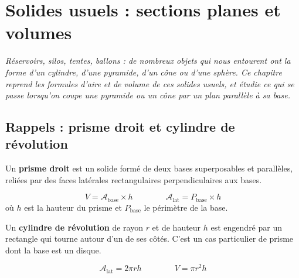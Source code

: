 \chapter{Solides usuels : sections planes et volumes}

\noindent\textit{Réservoirs, silos, tentes, ballons : de nombreux objets qui nous entourent
ont la forme d'un cylindre, d'une pyramide, d'un cône ou d'une sphère. Ce chapitre reprend
les formules d'aire et de volume de ces solides usuels, et étudie ce qui se passe lorsqu'on
coupe une pyramide ou un cône par un plan parallèle à sa base.}
\vspace{8pt}

\connecteBanner

\section{Rappels : prisme droit et cylindre de révolution}

\begin{definition}
Un \textbf{prisme droit} est un solide formé de deux bases superposables et parallèles,
reliées par des faces latérales rectangulaires perpendiculaires aux bases.
\end{definition}

\begin{propriete}
\[
V=\mathcal{A}_{\text{base}}\times h \qquad\qquad \mathcal{A}_{\text{lat}}=P_{\text{base}}\times h
\]
où $h$ est la hauteur du prisme et $P_{\text{base}}$ le périmètre de la base.
\end{propriete}

\begin{definition}
Un \textbf{cylindre de révolution} de rayon $r$ et de hauteur $h$ est engendré par un
rectangle qui tourne autour d'un de ses côtés. C'est un cas particulier de prisme dont la
base est un disque.
\end{definition}

\begin{propriete}
\[
\mathcal{A}_{\text{lat}}=2\pi r h \qquad\qquad V=\pi r^{2}h
\]
\end{propriete}

\begin{illus}
\end{illus}

